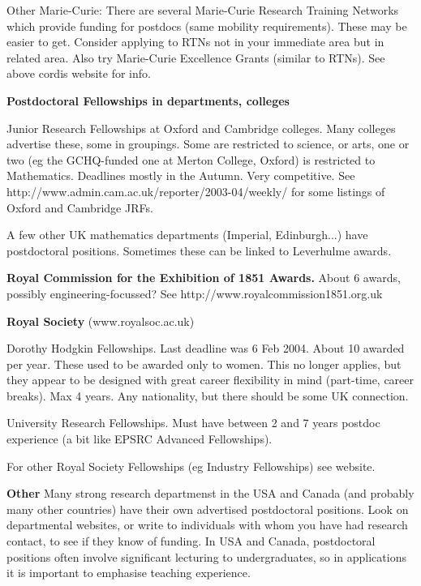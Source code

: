 \documentclass[a4,12pt]{article}
\begin{document}
Other Marie-Curie:  There are several Marie-Curie Research Training Networks which provide 
funding for postdocs 
(same mobility requirements). These may be easier to get. Consider applying to RTNs not in your
 immediate area but in related area. Also try Marie-Curie Excellence Grants (similar to RTNs).
See above cordis website for info.

\medskip

{\bf Postdoctoral Fellowships in departments, colleges}


 Junior Research Fellowships at Oxford and Cambridge colleges. Many colleges advertise these,
 some in groupings.
Some are restricted to science, or arts, one or two (eg the GCHQ-funded one at Merton College, Oxford)
 is restricted to Mathematics.
Deadlines mostly in the Autumn. Very competitive. See
http://www.admin.cam.ac.uk/reporter/2003-04/weekly/
for some listings of Oxford and Cambridge JRFs.

\smallskip

A few other UK mathematics departments (Imperial, Edinburgh...) have postdoctoral positions. 
Sometimes these
 can be linked to Leverhulme
awards.

\medskip


{\bf Royal Commission for the Exhibition of 1851 Awards.}  About 6 awards,
 possibly engineering-focussed? See
http://www.royalcommission1851.org.uk

\medskip



{\bf Royal Society} (www.royalsoc.ac.uk)

\smallskip

Dorothy Hodgkin Fellowships. Last deadline was 6 Feb 2004. About 10 awarded per year. These 
used to be
awarded only to women. This no longer applies, but they appear to be designed with great
 career flexibility in mind
(part-time, career breaks). Max 4 years. Any nationality, but there should be some UK connection. 

\smallskip

University Research Fellowships. Must have between 2 and 7 years postdoc experience
 (a bit like EPSRC Advanced Fellowships).

For other Royal Society Fellowships (eg Industry Fellowships) see website.

\medskip


{\bf Other}
Many  strong research departmenst in the USA and Canada (and probably many other countries)
have their own advertised postdoctoral positions. Look on departmental websites, or write
 to individuals with whom you have had research contact, to see if they 
know of funding. In USA and Canada, postdoctoral positions often involve significant 
lecturing to undergraduates, so in applications
it is important to emphasise teaching experience.
\end{document}

